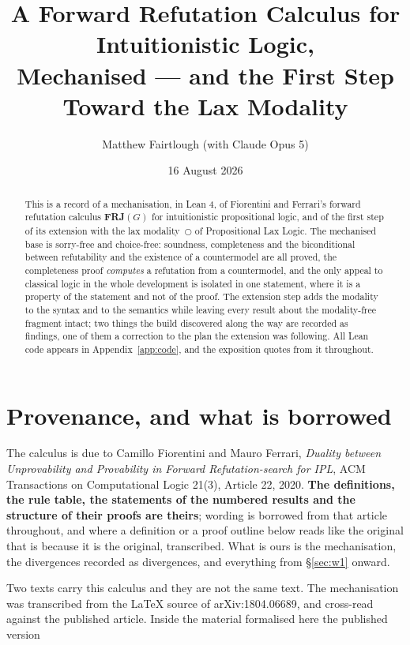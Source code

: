 \documentclass[11pt,a4paper]{article}
\title{A Forward Refutation Calculus for Intuitionistic Logic,\\
       Mechanised --- and the First Step Toward the Lax Modality}
\author{Matthew Fairtlough \quad (with Claude Opus 5)}
\date{16 August 2026}
\begin{document}
\maketitle

\begin{abstract}
This is a record of a mechanisation, in Lean 4, of Fiorentini and
Ferrari's forward refutation calculus \textbf{FRJ}$(G)$ for intuitionistic
propositional logic, and of the first step of its extension with the lax
modality~$\bigcirc$ of Propositional Lax Logic. The mechanised base is
sorry-free and choice-free: soundness, completeness and the biconditional
between refutability and the existence of a countermodel are all proved,
the completeness proof \emph{computes} a refutation from a countermodel,
and the only appeal to classical logic in the whole development is
isolated in one statement, where it is a property of the statement and not
of the proof. The extension step adds the modality to the syntax and to
the semantics while leaving every result about the modality-free fragment
intact; two things the build discovered along the way are recorded as
findings, one of them a correction to the plan the extension was following.
All Lean code appears in Appendix~\ref{app:code}, and the exposition
quotes from it throughout.
\end{abstract}

\tableofcontents

\section{Provenance, and what is borrowed}
\label{sec:prov}

The calculus is due to Camillo Fiorentini and Mauro Ferrari, \emph{Duality
between Unprovability and Provability in Forward Refutation-search for
IPL}, ACM Transactions on Computational Logic 21(3), Article 22, 2020.
\textbf{The definitions, the rule table, the statements of the numbered
results and the structure of their proofs are theirs}; wording is borrowed
from that article throughout, and where a definition or a proof outline
below reads like the original that is because it is the original,
transcribed. What is ours is the mechanisation, the divergences recorded
as divergences, and everything from \S\ref{sec:w1} onward.

Two texts carry this calculus and they are not the same text. The
mechanisation was transcribed from the \LaTeX{} source of
arXiv:1804.06689, and cross-read against the published article. Inside the
material formalised here the published version
\end{document}
